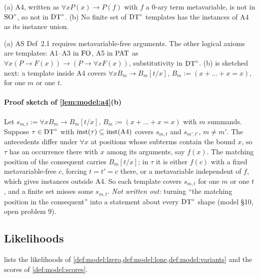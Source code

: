 \begin{lemma}\label{lem:model:a4}
(a) A4, written as $\forall xP(x)\to P(f)$ with $f$ a $0$-ary term metavariable, is not in $\mathrm{SO}^{\circ}$, so not in $\mathrm{DT}^{\circ}$. (b) No finite set of $\mathrm{DT}^{\circ}$ templates has the instances of A4 as its instance union.
\end{lemma}

\noindent (a) AS Def~2.1 requires metavariable-free arguments. The other logical axioms are templates: A1--A3 in $\mathrm{FO}$, A5 in $\mathrm{PAT}$ as $\forall x(P\to F(x))\to(P\to\forall xF(x))$, substitutivity in $\mathrm{DT}^{\circ}$. (b) is sketched next: a template inside A4 covers $\forall xB_m\to B_m[t/x]$, $B_m:=(x+\dots+x=x)$, for one $m$ or one $t$.

\paragraph{Proof sketch of \cref{lem:model:a4}(b)}\label{app:model:a4}
Let $s_{m,t}:=\forall xB_m\to B_m[t/x]$, $B_m:=(x+\dots+x=x)$ with $m$ summands. Suppose $\tau\in\mathrm{DT}^{\circ}$ with $\mathrm{inst}(\tau)\subseteq\mathrm{inst}(\mathrm{A4})$ covers $s_{m,t}$ and $s_{m',t'}$, $m\ne m'$. The antecedents differ under $\forall x$ at positions whose subterms contain the bound $x$, so $\tau$ has an occurrence there with $x$ among its arguments, say $f(x)$. The matching position of the consequent carries $B_m[t/x]$; in $\tau$ it is either $f(c)$ with a fixed metavariable-free $c$, forcing $t=t'=c$ there, or a metavariable independent of $f$, which gives instances outside A4. So each template covers $s_{m,t}$ for one $m$ or one $t$, and a finite set misses some $s_{m,t}$. \emph{Not written out:} turning ``the matching position in the consequent'' into a statement about every $\mathrm{DT}^{\circ}$ shape (model \S10, open problem 9).

\subsection{Likelihoods}\label{app:model:lik}

 lists the likelihoods of \cref{def:model:lzero,def:model:lone,def:model:variants} and the scores of \cref{def:model:scores}.

